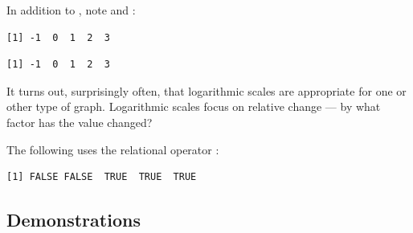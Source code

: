 In addition to , note  and :
\begin{knitrout}
\color{fgcolor}\begin{kframe}
\begin{alltt}
\hlstd{(}\hlstd{(}\hlstd{,} \hlstd{,} \hlstd{,} \hlstd{,} \hlstd{))}
\end{alltt}
\begin{verbatim}
[1] -1  0  1  2  3
\end{verbatim}
\begin{alltt}
\hlstd{(}\hlstd{(}\hlstd{,} \hlstd{,} \hlstd{,} \hlstd{,} \hlstd{))}
\end{alltt}
\begin{verbatim}
[1] -1  0  1  2  3
\end{verbatim}
\end{kframe}
\end{knitrout}
\noindent
It turns out, surprisingly often, that logarithmic scales are
appropriate for one or other type of graph.  Logarithmic scales focus
on relative change --- by what factor has the value changed?

The following uses the relational operator \txtt{$>$}:
\begin{knitrout}
\color{fgcolor}\begin{kframe}
\begin{alltt}
\hlstd{(}\hlopt{:}\hlstd{)} \hlopt{>}   
\end{alltt}
\begin{verbatim}
[1] FALSE FALSE  TRUE  TRUE  TRUE
\end{verbatim}
\end{kframe}
\end{knitrout}

\subsection*{Demonstrations}

